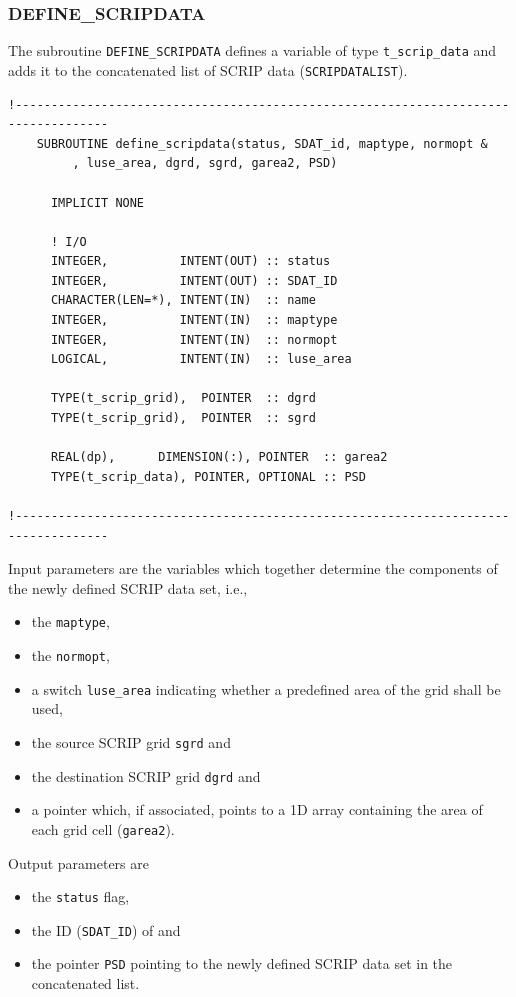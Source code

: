 \documentclass[11pt,twoside]{article}
\begin{document}
\subsubsection{DEFINE\_SCRIPDATA\label{DEFSD}}
The subroutine \verb|DEFINE_SCRIPDATA| defines a variable of
type \verb|t_scrip_data| and adds it to the concatenated list of SCRIP
data (\verb|SCRIPDATALIST|).
\begin{verbatim}
!-----------------------------------------------------------------------------------
    SUBROUTINE define_scripdata(status, SDAT_id, maptype, normopt &
         , luse_area, dgrd, sgrd, garea2, PSD)

      IMPLICIT NONE

      ! I/O
      INTEGER,          INTENT(OUT) :: status
      INTEGER,          INTENT(OUT) :: SDAT_ID
      CHARACTER(LEN=*), INTENT(IN)  :: name
      INTEGER,          INTENT(IN)  :: maptype
      INTEGER,          INTENT(IN)  :: normopt
      LOGICAL,          INTENT(IN)  :: luse_area

      TYPE(t_scrip_grid),  POINTER  :: dgrd
      TYPE(t_scrip_grid),  POINTER  :: sgrd

      REAL(dp),      DIMENSION(:), POINTER  :: garea2
      TYPE(t_scrip_data), POINTER, OPTIONAL :: PSD

!-----------------------------------------------------------------------------------
\end{verbatim}
Input parameters are the variables which together determine
the components of the newly defined SCRIP data set, i.e.,
\begin{itemize}
\item the \verb|maptype|,
\item the \verb|normopt|, 
\item a switch \verb|luse_area| indicating whether a
predefined area of the grid shall be used, 
\item the source SCRIP grid \verb|sgrd| and 
\item the destination SCRIP grid \verb|dgrd| and 
\item a pointer which, if associated, points to a 1D array containing the 
area of each grid cell (\verb|garea2|).
\end{itemize}

Output parameters are 
\begin{itemize}
\item the \verb|status| flag, 
\item the ID (\verb|SDAT_ID|) of and 
\item the pointer \verb|PSD| pointing to the
newly defined SCRIP data set in the concatenated list.
\end{itemize}
\end{document}
